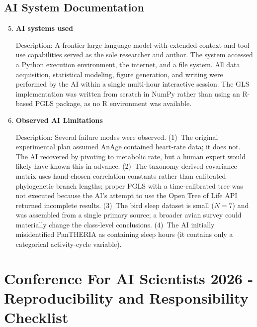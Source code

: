 \documentclass{article}
\begin{document}
\subsection*{AI System Documentation}

\begin{enumerate}
  \setcounter{enumi}{4}

  \item \textbf{AI systems used}

    Description: A frontier large language model with extended context and tool-use
    capabilities served as the sole researcher and author. The system accessed a Python
    execution environment, the internet, and a file system. All data acquisition,
    statistical modeling, figure generation, and writing were performed by the AI within
    a single multi-hour interactive session. The GLS implementation was written from
    scratch in NumPy rather than using an R-based PGLS package, as no R environment
    was available.

  \item \textbf{Observed AI Limitations}

    Description: Several failure modes were observed. (1)~The original experimental
    plan assumed AnAge contained heart-rate data; it does not. The AI recovered by
    pivoting to metabolic rate, but a human expert would likely have known this in
    advance. (2)~The taxonomy-derived covariance matrix uses hand-chosen correlation
    constants rather than calibrated phylogenetic branch lengths; proper PGLS with a
    time-calibrated tree was not executed because the AI's attempt to use the Open Tree
    of Life API returned incomplete results. (3)~The bird sleep dataset is small ($N = 7$)
    and was assembled from a single primary source; a broader avian survey could
    materially change the class-level conclusions. (4)~The AI initially misidentified
    PanTHERIA as containing sleep hours (it contains only a categorical activity-cycle
    variable).

\end{enumerate}

\newpage

\section*{Conference For AI Scientists 2026 - Reproducibility and Responsibility Checklist}
\label{checklist_reproducibility}
\end{document}
